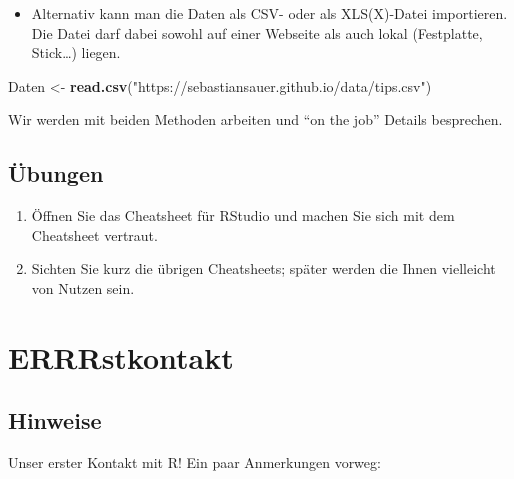 \documentclass[12pt,ngerman,]{book}
\newenvironment{Shaded}{\begin{snugshade}}{\end{snugshade}}
\newcommand{\KeywordTok}[1]{\textcolor[rgb]{0.13,0.29,0.53}{\textbf{{#1}}}}
\newcommand{\StringTok}[1]{\textcolor[rgb]{0.31,0.60,0.02}{{#1}}}
\newcommand{\NormalTok}[1]{{#1}}
\providecommand{\tightlist}{%
  \setlength{\itemsep}{0pt}\setlength{\parskip}{0pt}}
\renewenvironment{Shaded}{\begin{kframe}}{\end{kframe}}
\begin{document}
\begin{itemize}
\tightlist
\item
  Alternativ kann man die Daten als CSV- oder als XLS(X)-Datei
  importieren. Die Datei darf dabei sowohl auf einer Webseite als auch
  lokal (Festplatte, Stick\ldots{}) liegen.
\end{itemize}

\begin{Shaded}
\begin{Highlighting}[]
\NormalTok{Daten <-}\StringTok{ }\KeywordTok{read.csv}\NormalTok{(}\StringTok{"https://sebastiansauer.github.io/data/tips.csv"}\NormalTok{) }
\end{Highlighting}
\end{Shaded}

Wir werden mit beiden Methoden arbeiten und ``on the job'' Details
besprechen.

\subsection{Übungen}\label{ubungen}

\begin{enumerate}
\def\labelenumi{\arabic{enumi}.}
\item
  Öffnen Sie das Cheatsheet für RStudio und machen Sie sich mit dem
  Cheatsheet vertraut.
\item
  Sichten Sie kurz die übrigen Cheatsheets; später werden die Ihnen
  vielleicht von Nutzen sein.
\end{enumerate}

\section{ERRRstkontakt}\label{errrstkontakt}

\subsection{Hinweise}\label{hinweise}

Unser erster Kontakt mit R! Ein paar Anmerkungen vorweg:
\end{document}
